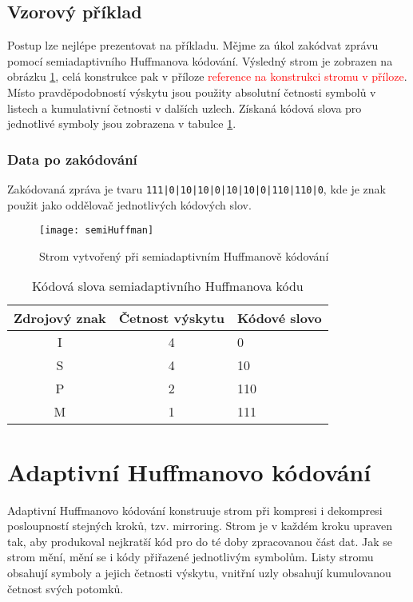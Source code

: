 \subsection{Vzorový příklad}
Postup lze nejlépe prezentovat na příkladu. Mějme za úkol zakódvat zprávu  pomocí semiadaptivního Huffmanova kódování. Výsledný strom je zobrazen na obrázku \ref{semiHuffmanStrom}, celá konstrukce pak v příloze \textcolor{red}{reference na konstrukci stromu v příloze}. Místo pravděpodobností výskytu jsou použity absolutní četnosti symbolů v listech a kumulativní četnosti v dalších uzlech. Získaná kódová slova pro jednotlivé symboly jsou zobrazena v tabulce \ref{semiHuffmanStrom}.

\subsubsection{Data po zakódování}
Zakódovaná zpráva je tvaru \texttt{111|0|10|10|0|10|10|0|110|110|0}, kde je znak \uv{\texttt{|}} použit jako oddělovač jednotlivých kódových slov.

\begin{figure}[!htb]
\centering
\texttt{[image: semiHuffman]}
\caption{Strom vytvořený při semiadaptivním Huffmanově kódování}
\label{semiHuffmanStrom}
\end{figure}

\begin{table}[!htb]
\centering
\begin{tabular}{|c|c|l|}
\hline
Zdrojový znak & Četnost výskytu & Kódové slovo\\
\hline
I & 4 & 0\\
S & 4 & 10\\
P & 2 & 110\\
M & 1 & 111\\
\hline
\end{tabular}
\caption{Kódová slova semiadaptivního Huffmanova kódu}
\label{semiHuffmanTabulka}
\end{table}

\section{Adaptivní Huffmanovo kódování}
\label{adaptivniHuffman}
Adaptivní Huffmanovo kódování konstruuje strom při kompresi i dekompresi posloupností stejných kroků, tzv. mirroring. Strom je v každém kroku upraven tak, aby produkoval nejkratší kód pro do té doby zpracovanou část dat. Jak se strom mění, mění se i kódy přiřazené jednotlivým symbolům. Listy stromu obsahují symboly a jejich četnosti výskytu, vnitřní uzly obsahují kumulovanou četnost svých potomků.

